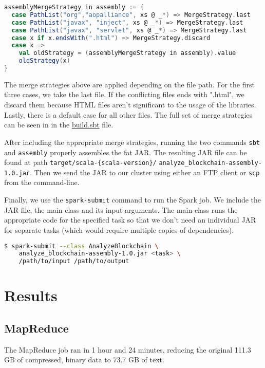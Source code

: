 \documentclass[9pt,twocolumn,twoside]{idsi}
\begin{document}
\begin{lstlisting}[language=Scala]
assemblyMergeStrategy in assembly := {
  case PathList("org","aopalliance", xs @ _*) => MergeStrategy.last
  case PathList("javax", "inject", xs @ _*) => MergeStrategy.last
  case PathList("javax", "servlet", xs @ _*) => MergeStrategy.last
  case x if x.endsWith(".html") => MergeStrategy.discard
  case x =>
    val oldStrategy = (assemblyMergeStrategy in assembly).value
    oldStrategy(x)
}
\end{lstlisting}

The merge strategies above are applied depending on the file path. For the first three cases, we take the last file. If the conflicting files ends with ".html", we discard them because HTML files aren't significant to the usage of the libraries. Lastly, there is a default case for all other files. The full set of merge strategies can be seen in in the \href{https://github.com/nishilshah17/idsi_bitcoin/blob/d2f1e0257ff684e99356de052eed1c6868ffe82f/analyze_blockchain/build.sbt#L14}{build.sbt} file.

After including the appropriate merge strategies, running the two commands \lstinline{sbt} and \lstinline{assembly} properly assembles the fat JAR. The resulting JAR file can be found at path \lstinline|target/scala-{scala-version}/| \lstinline|analyze_blockchain-assembly-1.0.jar|. Then we send the JAR to our cluster using either an FTP client or \lstinline{scp} from the command-line.

Finally, we use the \lstinline{spark-submit} command to run the Spark job. We include the JAR file, the main class and its input arguments. The main class runs the appropriate code for the specified task so that we don't need an individual JAR for separate tasks (which would require multiple copies of dependencies).

\begin{lstlisting}[language=bash]
 $ spark-submit --class AnalyzeBlockchain \
    analyze_blockchain-assembly-1.0.jar <task> \
    /path/to/input /path/to/output
\end{lstlisting}

\section{Results}
\subsection{MapReduce}
The MapReduce job ran in 1 hour and 24 minutes, reducing the original 111.3 GB of compressed, binary data to 73.7 GB of text.
\end{document}
